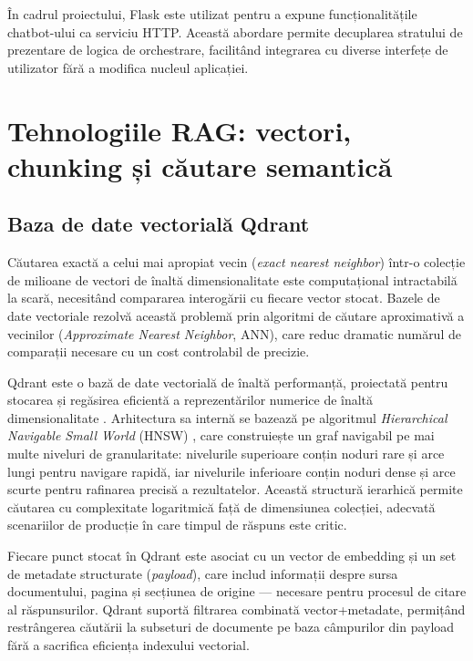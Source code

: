 \documentclass[12pt, a4paper, oneside, romanian]{teza-upb}
\begin{document}
În cadrul proiectului, Flask este utilizat pentru a expune funcționalitățile chatbot-ului ca serviciu HTTP. Această abordare permite decuplarea stratului de prezentare de logica de orchestrare, facilitând integrarea cu diverse interfețe de utilizator fără a modifica nucleul aplicației.

\section{Tehnologiile RAG: vectori, chunking și căutare semantică}

\subsection{Baza de date vectorială Qdrant}

Căutarea exactă a celui mai apropiat vecin (\textit{exact nearest neighbor}) într-o colecție de milioane de vectori de înaltă dimensionalitate este computațional intractabilă la scară, necesitând compararea interogării cu fiecare vector stocat. Bazele de date vectoriale rezolvă această problemă prin algoritmi de căutare aproximativă a vecinilor (\textit{Approximate Nearest Neighbor}, ANN), care reduc dramatic numărul de comparații necesare cu un cost controlabil de precizie.

Qdrant este o bază de date vectorială de înaltă performanță, proiectată pentru stocarea și regăsirea eficientă a reprezentărilor numerice de înaltă dimensionalitate \cite{qdrant_doc}. Arhitectura sa internă se bazează pe algoritmul \textit{Hierarchical Navigable Small World} (HNSW) \cite{malkov2018hnsw}, care construiește un graf navigabil pe mai multe niveluri de granularitate: nivelurile superioare conțin noduri rare și arce lungi pentru navigare rapidă, iar nivelurile inferioare conțin noduri dense și arce scurte pentru rafinarea precisă a rezultatelor. Această structură ierarhică permite căutarea cu complexitate logaritmică față de dimensiunea colecției, adecvată scenariilor de producție în care timpul de răspuns este critic.

Fiecare punct stocat în Qdrant este asociat cu un vector de embedding și un set de metadate structurate (\textit{payload}), care includ informații despre sursa documentului, pagina și secțiunea de origine — necesare pentru procesul de citare al răspunsurilor. Qdrant suportă filtrarea combinată vector+metadate, permițând restrângerea căutării la subseturi de documente pe baza câmpurilor din payload fără a sacrifica eficiența indexului vectorial.
\end{document}
